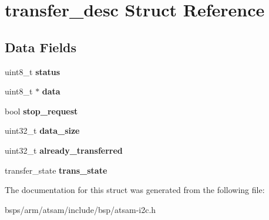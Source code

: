 \hypertarget{structtransfer__desc}{}\section{transfer\+\_\+desc Struct Reference}
\label{structtransfer__desc}
\subsection*{Data Fields}
\begin{DoxyCompactItemize}
\item 
\mbox{\label{structtransfer__desc_aa18e9a2b1ac1b0b20f5a48111e9ae4bc}} 
uint8\+\_\+t {\bfseries status}
\item 
\mbox{\label{structtransfer__desc_ab5cac61152845e0dd345597856ed0689}} 
uint8\+\_\+t $\ast$ {\bfseries data}
\item 
\mbox{\label{structtransfer__desc_a0dbbaf4eba0a8267978db46bb550bc47}} 
bool {\bfseries stop\+\_\+request}
\item 
\mbox{\label{structtransfer__desc_ade9002e07f6b8b6fa00ff85f4c241c37}} 
uint32\+\_\+t {\bfseries data\+\_\+size}
\item 
\mbox{\label{structtransfer__desc_a82b854aeac61b3ea2894a95c0484f577}} 
uint32\+\_\+t {\bfseries already\+\_\+transferred}
\item 
\mbox{\label{structtransfer__desc_a27ffa404e341cac9c7b09bf9cc8c5965}} 
transfer\+\_\+state {\bfseries trans\+\_\+state}
\end{DoxyCompactItemize}


The documentation for this struct was generated from the following file\+:\begin{DoxyCompactItemize}
\item 
bsps/arm/atsam/include/bsp/atsam-\/i2c.\+h\end{DoxyCompactItemize}

